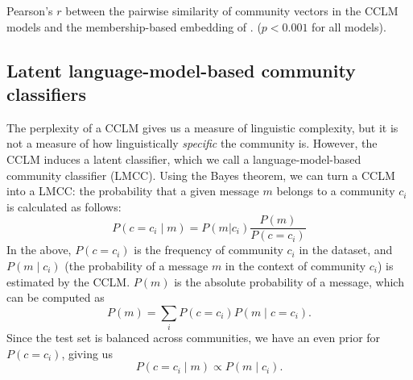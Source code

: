 \documentclass[11pt,a4paper]{article}
\begin{document}
\begin{table}
  \centering
  
  \caption{Pearson's $r$ between the pairwise similarity of community vectors
  in the CCLM models and the membership-based embedding of \citet{Kumar2018}.
  ($p<0.001$ for all models).
  }
  \label{tab:pairwise-comm-sim}
\end{table}

\subsection{Latent language-model-based community classifiers}

The perplexity of a CCLM gives us a measure of linguistic complexity,
but it is not a measure of how linguistically \emph{specific} the
community is. However, the CCLM induces a latent classifier,
which we call a language-model-based community classifier
(LMCC). Using the Bayes theorem, we can turn a
CCLM into a LMCC: the probability that a given message $m$
belongs to a community $c_i$ is calculated as follows:
\[P(c=c_i \mid m) = P(m | c_i)\frac {P(m)} {P(c=c_i)}\]
In the above,
$P(c=c_i)$ is the frequency of community $c_i$ in the dataset, and
$P(m \mid c_i)$ (the probability of a message $m$
in the context of community $c_i$) is estimated by the CCLM. 
$P(m)$ is the absolute
probability of a message, which can be computed as
\[P(m) = \sum_i P(c=c_i) P(m\mid c=c_i ). \]
Since the test set is balanced across communities,
we have an even prior for $P(c=c_i)$, giving us
\[P(c=c_i\mid m) \propto  P(m\mid c_i).\]
\end{document}
